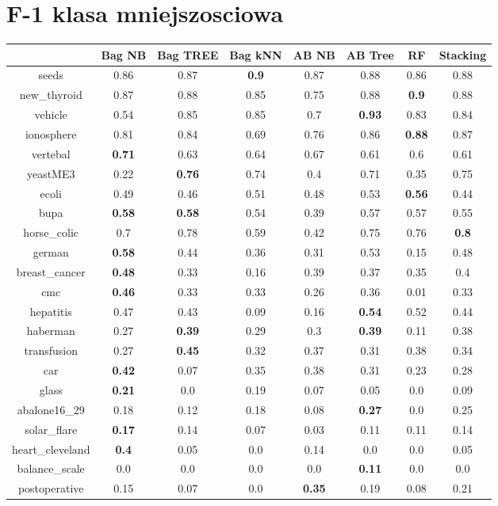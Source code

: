 \documentclass{article}%
\begin{document}
\section*{F{-}1 klasa mniejszosciowa}%
\begin{tabular}{c|ccccccc}%
&Bag NB&Bag TREE&Bag kNN&AB NB&AB Tree&RF&Stacking\\%
\hline%
seeds&0.86&0.87&\textbf{0.9}&0.87&0.88&0.86&0.88\\%
new\_thyroid&0.87&0.88&0.85&0.75&0.88&\textbf{0.9}&0.88\\%
vehicle&0.54&0.85&0.85&0.7&\textbf{0.93}&0.83&0.84\\%
ionosphere&0.81&0.84&0.69&0.76&0.86&\textbf{0.88}&0.87\\%
vertebal&\textbf{0.71}&0.63&0.64&0.67&0.61&0.6&0.61\\%
yeastME3&0.22&\textbf{0.76}&0.74&0.4&0.71&0.35&0.75\\%
ecoli&0.49&0.46&0.51&0.48&0.53&\textbf{0.56}&0.44\\%
bupa&\textbf{0.58}&\textbf{0.58}&0.54&0.39&0.57&0.57&0.55\\%
horse\_colic&0.7&0.78&0.59&0.42&0.75&0.76&\textbf{0.8}\\%
german&\textbf{0.58}&0.44&0.36&0.31&0.53&0.15&0.48\\%
breast\_cancer&\textbf{0.48}&0.33&0.16&0.39&0.37&0.35&0.4\\%
cmc&\textbf{0.46}&0.33&0.33&0.26&0.36&0.01&0.33\\%
hepatitis&0.47&0.43&0.09&0.16&\textbf{0.54}&0.52&0.44\\%
haberman&0.27&\textbf{0.39}&0.29&0.3&\textbf{0.39}&0.11&0.38\\%
transfusion&0.27&\textbf{0.45}&0.32&0.37&0.31&0.38&0.34\\%
car&\textbf{0.42}&0.07&0.35&0.38&0.31&0.23&0.28\\%
glass&\textbf{0.21}&0.0&0.19&0.07&0.05&0.0&0.09\\%
abalone16\_29&0.18&0.12&0.18&0.08&\textbf{0.27}&0.0&0.25\\%
solar\_flare&\textbf{0.17}&0.14&0.07&0.03&0.11&0.11&0.14\\%
heart\_cleveland&\textbf{0.4}&0.05&0.0&0.14&0.0&0.0&0.05\\%
balance\_scale&0.0&0.0&0.0&0.0&\textbf{0.11}&0.0&0.0\\%
postoperative&0.15&0.07&0.0&\textbf{0.35}&0.19&0.08&0.21\\%
\end{tabular}

%
\end{document}
